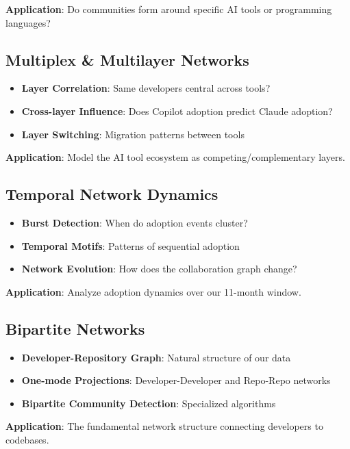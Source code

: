 \documentclass[11pt,letterpaper]{article}
\begin{document}
\textbf{Application}: Do communities form around specific AI tools or programming languages?

\subsection{Multiplex \& Multilayer Networks}

\begin{itemize}
    \item \textbf{Layer Correlation}: Same developers central across tools?
    \item \textbf{Cross-layer Influence}: Does Copilot adoption predict Claude adoption?
    \item \textbf{Layer Switching}: Migration patterns between tools
\end{itemize}

\textbf{Application}: Model the AI tool ecosystem as competing/complementary layers.

\subsection{Temporal Network Dynamics}

\begin{itemize}
    \item \textbf{Burst Detection}: When do adoption events cluster?
    \item \textbf{Temporal Motifs}: Patterns of sequential adoption
    \item \textbf{Network Evolution}: How does the collaboration graph change?
\end{itemize}

\textbf{Application}: Analyze adoption dynamics over our 11-month window.

\subsection{Bipartite Networks}

\begin{itemize}
    \item \textbf{Developer-Repository Graph}: Natural structure of our data
    \item \textbf{One-mode Projections}: Developer-Developer and Repo-Repo networks
    \item \textbf{Bipartite Community Detection}: Specialized algorithms
\end{itemize}

\textbf{Application}: The fundamental network structure connecting developers to codebases.
\end{document}
